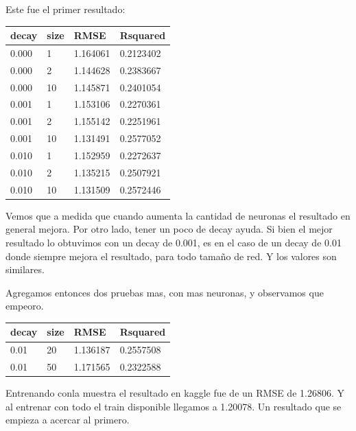 Este fue el primer resultado:

\begin{center}
    \begin{tabular}{| l | l | l | l |}
    \hline
    decay & size & RMSE & Rsquared \\ \hline
    0.000 & 1 & 1.164061 & 0.2123402 \\ 
    0.000 & 2 & 1.144628 & 0.2383667  \\
    0.000 & 10 & 1.145871 & 0.2401054  \\
    0.001 & 1 & 1.153106 & 0.2270361  \\
    0.001 & 2 & 1.155142 & 0.2251961  \\
    0.001 & 10 & 1.131491 & 0.2577052  \\
    0.010 & 1 & 1.152959 & 0.2272637  \\
    0.010 & 2 & 1.135215 & 0.2507921  \\
    0.010 & 10 & 1.131509 & 0.2572446  \\
    \hline
    \end{tabular}
\end{center}

Vemos que a medida que cuando aumenta la cantidad de neuronas el resultado en general mejora. Por otro lado, tener un poco de decay ayuda. Si bien el mejor resultado lo obtuvimos con un decay de 0.001, es en el caso de un decay de 0.01 donde siempre mejora el resultado, para todo tamaño de red. Y los valores son similares.

Agregamos entonces dos pruebas mas, con mas neuronas, y observamos que empeoro.

\begin{center}
    \begin{tabular}{| l | l | l | l |}
    \hline
    decay & size & RMSE & Rsquared \\ \hline
    0.01 & 20 & 1.136187 & 0.2557508 \\
    0.01 & 50 & 1.171565 & 0.2322588 \\
    \hline
    \end{tabular}
\end{center}

Entrenando conla muestra el resultado en kaggle fue de un RMSE de 1.26806. Y al entrenar con todo el train disponible llegamos a 1.20078. Un resultado que se empieza a acercar al primero.

